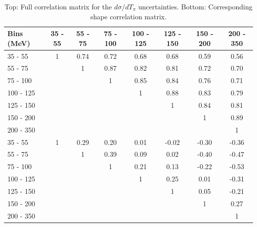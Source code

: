 \begingroup
\squeezetable
\begin{table}[h]
\begin{tabular}{l|ccccccc}
\hline\hline
Bins (MeV) & 35 - 55 & 55 - 75 & 75 - 100 & 100 - 125 & 125 - 150 & 150 - 200 & 200 - 350 \\ 
\hline
35 - 55 & 1 & 0.74 & 0.72 & 0.68 & 0.68 & 0.59 & 0.56 \\ 
55 - 75 &  & 1 & 0.87 & 0.82 & 0.81 & 0.72 & 0.70 \\ 
75 - 100 &  &  & 1 & 0.85 & 0.84 & 0.76 & 0.71 \\ 
100 - 125 &  &  &  & 1 & 0.88 & 0.83 & 0.79 \\ 
125 - 150 &  &  &  &  & 1 & 0.84 & 0.81 \\ 
150 - 200 &  &  &  &  &  & 1 & 0.89 \\ 
200 - 350 &  &  &  &  &  &  & 1 \\ 
\hline
35 - 55 & 1 & 0.29 & 0.20 & 0.01 & -0.02 & -0.30 & -0.36 \\ 
55 - 75 &  & 1 & 0.39 & 0.09 & 0.02 & -0.40 & -0.47 \\ 
75 - 100 &  &  & 1 & 0.21 & 0.13 & -0.22 & -0.53 \\ 
100 - 125 &  &  &  & 1 & 0.25 & 0.01 & -0.31 \\ 
125 - 150 &  &  &  &  & 1 & 0.05 & -0.21 \\ 
150 - 200 &  &  &  &  &  & 1 & 0.27 \\ 
200 - 350 &  &  &  &  &  &  & 1 \\ 
\hline\hline
\end{tabular}
\caption{Top: Full correlation matrix for the \cconepi $d\sigma / dT_\pi$ uncertainties.  Bottom: Corresponding shape correlation matrix.}
\end{table}
\endgroup


